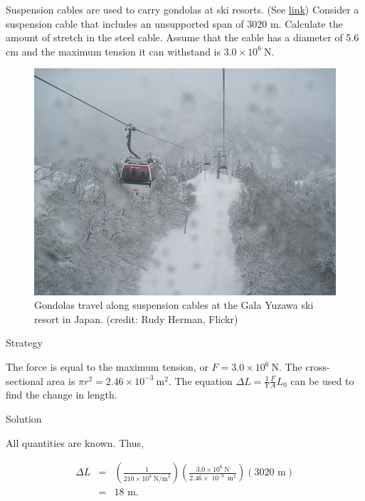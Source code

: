 \documentclass[
]{book}
\begin{document}
Suspension cables are used to carry gondolas at ski resorts. (See
\protect\hyperlink{import-auto-id1165298535463}{link}) Consider a
suspension cable that includes an unsupported span of 3020 m. Calculate
the amount of stretch in the steel cable. Assume that the cable has a
diameter of 5.6 cm and the maximum tension it can withstand is
\({3\text{.}{0 \times \text{10}^{6}}\ \text{N}}{}\).

\begin{figure}
\hypertarget{import-auto-id1165298535463}{%
\centering
\includegraphics{images/Figure_06_03_04a.jpg}
\caption{Gondolas travel along suspension cables at the Gala Yuzawa ski resort
in Japan. (credit: Rudy Herman,
Flickr)}\label{import-auto-id1165298535463}
}
\end{figure}

{Strategy}

The force is equal to the maximum tension, or
\({{F = 3}\text{.}{0 \times \text{10}^{6}}\ \text{N}}{}\). The
cross-sectional area is
\({{{\pi r}^{2} = 2}\text{.}{\text{46} \times \text{10}^{- 3}}\ \text{m}^{2}}{}\).
The equation \({{\Delta L = \frac{1}{Y}}\frac{F}{A}L_{0}}{}\) can be used
to find the change in length.

{Solution}

All quantities are known. Thus,

\leavevmode{}%
\[\begin{array}{lll}
{\Delta L} & = & {\left( \frac{1}{{\text{210} \times \text{10}^{9}}\ \text{N/m}^{2}} \right)\left( \frac{3\text{.}{0 \times \text{10}^{6}\ }\text{N}}{2.46 \times \operatorname{10}^{–3}\ \text{m}^{2}} \right)\left( \text{3020\ m} \right)} \\
 & = & {\text{18\ m}.} \\
\end{array}{}\]
\end{document}
